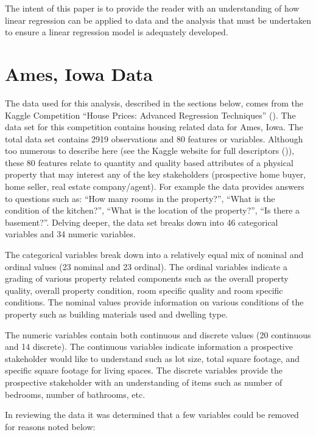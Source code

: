 \documentclass[american,]{article}
\begin{document}
The intent of this paper is to provide the reader with an understanding
of how linear regression can be applied to data and the analysis that
must be undertaken to ensure a linear regression model is adequately
developed.

\citet{Sleuth}

\section{Ames, Iowa Data}\label{ames-iowa-data}

The data used for this analysis, described in the sections below, comes
from the Kaggle Competition ``House Prices: Advanced Regression
Techniques'' (\citet{Kaggle2016}). The data set for this competition
contains housing related data for Ames, Iowa. The total data set
contains 2919 observations and 80 features or variables. Although too
numerous to describe here (see the Kaggle website for full descriptors
(\citet{Kaggle2016})), these 80 features relate to quantity and quality
based attributes of a physical property that may interest any of the key
stakeholders (prospective home buyer, home seller, real estate
company/agent). For example the data provides answers to questions such
as: ``How many rooms in the property?'', ``What is the condition of the
kitchen?'', ``What is the location of the property?'', ``Is there a
basement?''. Delving deeper, the data set breaks down into 46
categorical variables and 34 numeric variables.

The categorical variables break down into a relatively equal mix of
nominal and ordinal values (23 nominal and 23 ordinal). The ordinal
variables indicate a grading of various property related components such
as the overall property quality, overall property condition, room
specific quality and room specific conditions. The nominal values
provide information on various conditions of the property such as
building materials used and dwelling type. \citet{DeCock2011}

The numeric variables contain both continuous and discrete values (20
continuous and 14 discrete). The continuous variables indicate
information a prospective stakeholder would like to understand such as
lot size, total square footage, and specific square footage for living
spaces. The discrete variables provide the prospective stakeholder with
an understanding of items such as number of bedrooms, number of
bathrooms, etc. \citet{DeCock2011}

In reviewing the data it was determined that a few variables could be
removed for reasons noted below:
\end{document}
